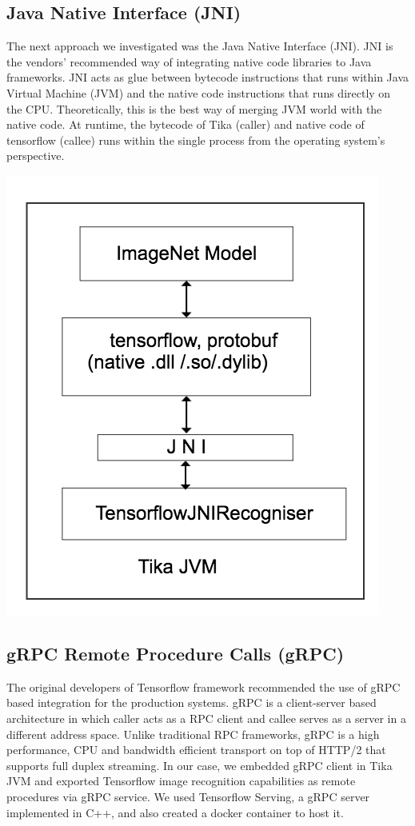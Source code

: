 \documentclass[letterpaper, 10 pt, conference]{ieeeconf}  %
\begin{document}
\subsection{Java Native Interface (JNI)} \label{sec:int-jni}
The next approach we investigated was the Java Native Interface (JNI). JNI is the vendors' recommended way of integrating native code libraries to Java frameworks\cite{}. JNI acts as glue between bytecode instructions that runs within Java Virtual Machine (JVM) and the native  code instructions that runs directly on the CPU. Theoretically, this is the best way of merging JVM world with the native code\cite{}. At runtime, the bytecode of Tika (caller) and native code of tensorflow (callee) runs within the single process from the operating system's perspective.

\includegraphics[scale=0.40]{tika-tflow-jni-design}

\subsection{gRPC Remote Procedure Calls (gRPC)} \label{sec:int-rpc}
The original developers of Tensorflow framework recommended the use of gRPC based integration for the production systems\cite{}. gRPC is a client-server based architecture in which caller acts as a RPC client and callee serves as a server in a different address space. Unlike traditional RPC frameworks, gRPC is a high performance, CPU and bandwidth efficient transport on top of HTTP/2 that supports full duplex streaming\cite{}. In our case, we embedded gRPC client in Tika JVM and exported Tensorflow image recognition capabilities as remote procedures via gRPC service. We used Tensorflow Serving\cite{}, a gRPC\cite{} server implemented in C++, and also created a docker container to host it.
\end{document}
